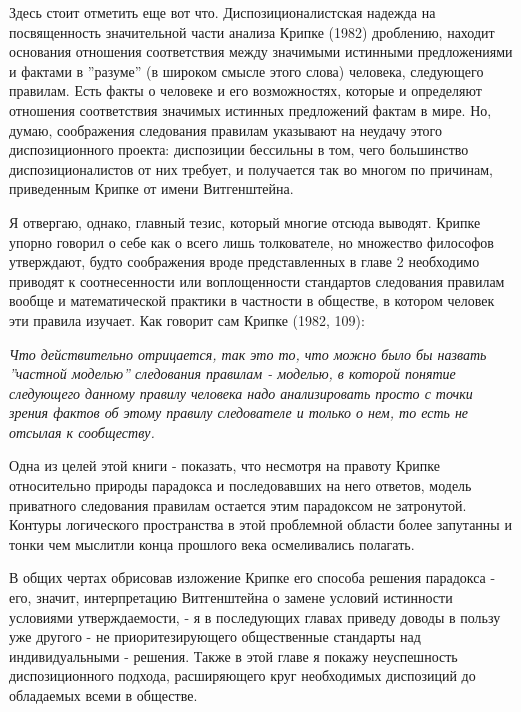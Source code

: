 \documentclass{book}
\begin{document}
Здесь стоит отметить еще вот что. Диспозиционалистская надежда на посвященность значительной части анализа Крипке (1982) дроблению, находит основания отношения соответствия между значимыми истинными предложениями и фактами в ''разуме'' (в широком смысле этого слова) человека, следующего правилам. Есть факты о человеке и его возможностях, которые и определяют отношения соответствия значимых истинных предложений фактам в мире. Но, думаю, соображения следования правилам указывают на неудачу этого диспозиционного проекта: диспозиции бессильны в том, чего большинство диспозиционалистов от них требует, и получается так во многом по причинам, приведенным Крипке от имени Витгенштейна.

Я отвергаю, однако, главный тезис, который многие отсюда выводят. Крипке упорно говорил о себе как о всего лишь толкователе, но множество философов утверждают, будто соображения вроде представленных в главе 2 необходимо приводят к соотнесенности или воплощенности стандартов следования правилам вообще и математической практики в частности в обществе, в котором человек эти правила изучает. Как говорит сам Крипке (1982, 109):

\textit{Что действительно отрицается, так это то, что можно было бы назвать ''частной моделью'' следования правилам - моделью, в которой понятие следующего данному правилу человека надо анализировать просто с точки зрения фактов об этому правилу следователе и только о нем, то есть не отсылая к сообществу.}

Одна из целей этой книги - показать, что несмотря на правоту Крипке относительно природы парадокса и последовавших на него ответов, модель приватного следования правилам остается этим парадоксом не затронутой. Контуры логического пространства в этой проблемной области более запутанны и тонки чем мыслитли конца прошлого века осмеливались полагать.

В общих чертах обрисовав изложение Крипке его способа решения парадокса - его, значит, интерпретацию Витгенштейна о замене условий истинности условиями утверждаемости, - я в последующих главах приведу доводы в пользу уже другого - не приоритезирующего общественные стандарты над индивидуальными - решения. Также в этой главе я покажу неуспешность диспозиционного подхода, расширяющего круг необходимых диспозиций до обладаемых всеми в обществе.
\end{document}
